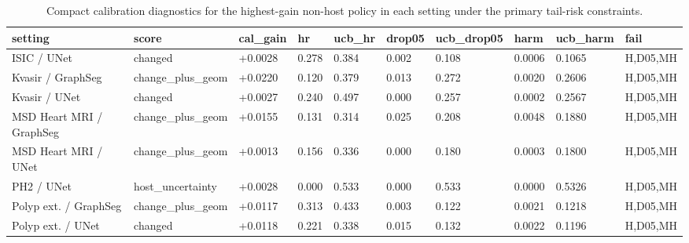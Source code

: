 \begin{table}[t]
\centering
\small
\caption{Compact calibration diagnostics for the highest-gain non-host policy in each setting under the primary tail-risk constraints.}
\label{tab:tail_risk_nonhost_diagnostics_compact}
\begin{tabular}{llllllllll}
\toprule
setting & score & cal\_gain & hr & ucb\_hr & drop05 & ucb\_drop05 & harm & ucb\_harm & fail \\
\midrule
ISIC / UNet & changed & +0.0028 & 0.278 & 0.384 & 0.002 & 0.108 & 0.0006 & 0.1065 & H,D05,MH \\
Kvasir / GraphSeg & change\_plus\_geom & +0.0220 & 0.120 & 0.379 & 0.013 & 0.272 & 0.0020 & 0.2606 & H,D05,MH \\
Kvasir / UNet & changed & +0.0027 & 0.240 & 0.497 & 0.000 & 0.257 & 0.0002 & 0.2567 & H,D05,MH \\
MSD Heart MRI / GraphSeg & change\_plus\_geom & +0.0155 & 0.131 & 0.314 & 0.025 & 0.208 & 0.0048 & 0.1880 & H,D05,MH \\
MSD Heart MRI / UNet & change\_plus\_geom & +0.0013 & 0.156 & 0.336 & 0.000 & 0.180 & 0.0003 & 0.1800 & H,D05,MH \\
PH2 / UNet & host\_uncertainty & +0.0028 & 0.000 & 0.533 & 0.000 & 0.533 & 0.0000 & 0.5326 & H,D05,MH \\
Polyp ext. / GraphSeg & change\_plus\_geom & +0.0117 & 0.313 & 0.433 & 0.003 & 0.122 & 0.0021 & 0.1218 & H,D05,MH \\
Polyp ext. / UNet & changed & +0.0118 & 0.221 & 0.338 & 0.015 & 0.132 & 0.0022 & 0.1196 & H,D05,MH \\
\bottomrule
\end{tabular}
\end{table}
